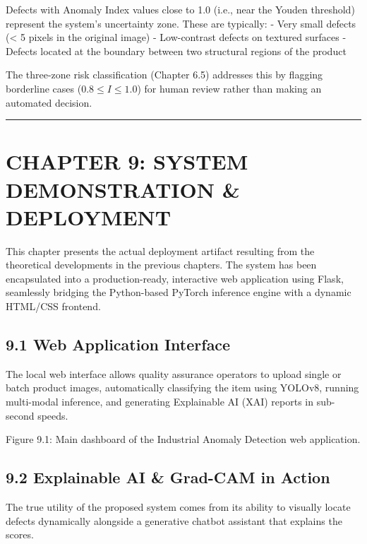 Defects with Anomaly Index values close to 1.0 (i.e., near the Youden threshold) represent the system's uncertainty zone. These are typically: - Very small defects (\textless{} 5 pixels in the original image) - Low-contrast defects on textured surfaces - Defects located at the boundary between two structural regions of the product

The three-zone risk classification (Chapter 6.5) addresses this by flagging borderline cases (\(0.8 \leq I \leq 1.0\)) for human review rather than making an automated decision.

\begin{center}\rule{0.5\linewidth}{0.5pt}\end{center}

\section{CHAPTER 9: SYSTEM DEMONSTRATION \& DEPLOYMENT}\label{chapter-9-system-demonstration-deployment}

This chapter presents the actual deployment artifact resulting from the theoretical developments in the previous chapters. The system has been encapsulated into a production-ready, interactive web application using Flask, seamlessly bridging the Python-based PyTorch inference engine with a dynamic HTML/CSS frontend.

\subsection{9.1 Web Application Interface}\label{web-application-interface}

The local web interface allows quality assurance operators to upload single or batch product images, automatically classifying the item using YOLOv8, running multi-modal inference, and generating Explainable AI (XAI) reports in sub-second speeds.

Figure 9.1: Main dashboard of the Industrial Anomaly Detection web application.

\subsection{9.2 Explainable AI \& Grad-CAM in Action}\label{explainable-ai-grad-cam-in-action}

The true utility of the proposed system comes from its ability to visually locate defects dynamically alongside a generative chatbot assistant that explains the scores.

